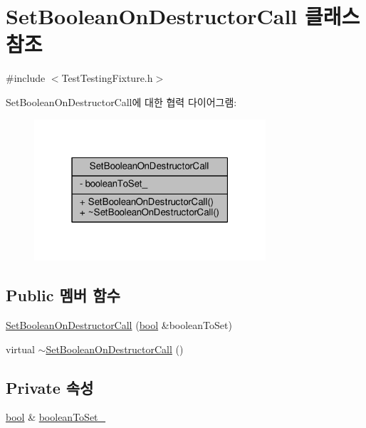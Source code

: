 \hypertarget{class_set_boolean_on_destructor_call}{}\section{Set\+Boolean\+On\+Destructor\+Call 클래스 참조}
\label{class_set_boolean_on_destructor_call}


{\ttfamily \#include $<$Test\+Testing\+Fixture.\+h$>$}



Set\+Boolean\+On\+Destructor\+Call에 대한 협력 다이어그램\+:
\nopagebreak
\begin{figure}[H]
\begin{center}
\leavevmode
\includegraphics[width=244pt]{class_set_boolean_on_destructor_call__coll__graph}
\end{center}
\end{figure}
\subsection*{Public 멤버 함수}
\begin{DoxyCompactItemize}
\item 
\hyperlink{class_set_boolean_on_destructor_call_aaef73ad4f5cbeeb8ae9a97e1602400b5}{Set\+Boolean\+On\+Destructor\+Call} (\hyperlink{avb__gptp_8h_af6a258d8f3ee5206d682d799316314b1}{bool} \&boolean\+To\+Set)
\item 
virtual \hyperlink{class_set_boolean_on_destructor_call_a344826a3f57773da571b5ae83d7046a7}{$\sim$\+Set\+Boolean\+On\+Destructor\+Call} ()
\end{DoxyCompactItemize}
\subsection*{Private 속성}
\begin{DoxyCompactItemize}
\item 
\hyperlink{avb__gptp_8h_af6a258d8f3ee5206d682d799316314b1}{bool} \& \hyperlink{class_set_boolean_on_destructor_call_ab5003d5457b5d41b793621988f1510c2}{boolean\+To\+Set\+\_\+}
\end{DoxyCompactItemize}



